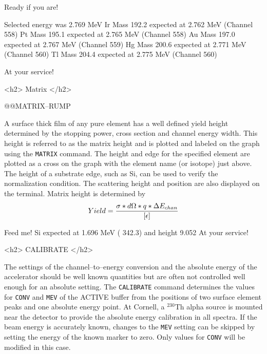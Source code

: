 {{{{{Ready if you are! 

 Selected energy was  2.769 MeV
 Ir Mass 192.2   expected at  2.762 MeV (Channel  558)
 Pt Mass 195.1   expected at  2.765 MeV (Channel  558)
 Au Mass 197.0   expected at  2.767 MeV (Channel  559)
 Hg Mass 200.6   expected at  2.771 MeV (Channel  560)
 Tl Mass 204.4   expected at  2.775 MeV (Channel  560)

At your service! 
\endscreen

<h2> Matrix </h2>


@@{MATRIX--RUMP}

A surface thick film of any pure element has a well defined yield height
determined by the stopping power, cross section and channel energy width. 
This height is referred to as the matrix height and is plotted and labeled on
the graph using the {\tt MATRIX} command.  The height and edge for the
specified element are plotted as a cross on the graph with the element name 
(or isotope) just above.  The height of a substrate edge, such as Si, can be
used to verify the normalization condition.  The scattering height and
position are also displayed on the terminal.  Matrix height is determined by
$$
     Yield =  { {\sigma * d\Omega * q *\Delta E_{chan}} \over {[\epsilon]}}
$$

\medskip\beginscreen
Feed me! 
 Si expected at  1.696 MeV ( 342.3) and height    9.052
At your service! 

\endscreen

<h2> CALIBRATE </h2>


The settings of the channel--to--energy conversion and the absolute energy of
the accelerator should be well known quantities but are often not controlled
well enough for an absolute setting.  The {\tt CALIBRATE} command determines
the values for {\tt CONV} and {\tt MEV} of the ACTIVE buffer from the
positions of two surface element peaks and one absolute energy point.
At Cornell, a $^{230}$Th alpha source is mounted near the detector to
provide the absolute energy calibration in all spectra.  If the beam energy is
accurately known, changes to the {\tt MEV} setting can be skipped by setting
the energy of the known marker to zero.  Only values for {\tt CONV} will be
modified in this case. 

}}}}}
